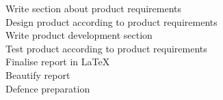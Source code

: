 \begin{table}[H]
\begin{tabular}
\hline
Write section about product requirements    \offr[3] \off[21] \\
\hline
Design product according to product requirements    \offr[3] \off[21] \\
\hline
Write product development section    \offr[3] \off[21] \\
\hline
Test product according to product requirements    \offr[3] \off[21] \\
\hline
Finalise report in LaTeX    \offr[3] \off[21] \\
\hline
Beautify report    \offr[3] \off[21] \\
\hline
Defence preparation     \offr[3] \off[16] \on[5]\\
\hline
\end{tabular}
\end{table}
\fi



